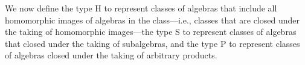 We now define the type \af H to represent classes of algebras that include all homomorphic images of algebras in the class---i.e., classes that are closed under the taking of homomorphic images---the type \af S to represent classes of algebras that closed under the taking of subalgebras, and the type \af P to represent classes of algebras closed under the taking of arbitrary products.

\begin{code}%
\>[0]\<%
\\
\>[0]\AgdaSpace{}%
\AgdaModule{\AgdaUnderscore{}}\AgdaSpace{}%
\AgdaSymbol{\{}\AgdaSpace{}%
\AgdaSpace{}%
\AgdaSpace{}%
\AgdaSpace{}%
\AgdaSymbol{:}\AgdaSpace{}%
\AgdaSymbol{\}}\AgdaSpace{}%
\<%
\end{code}
\fi
